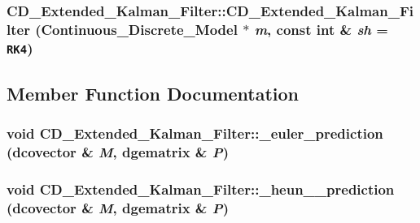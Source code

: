 \hypertarget{class_c_d___extended___kalman___filter_01743a0e2ac32830a65da4dc7885cc20}{
\subsubsection[{CD\_\-Extended\_\-Kalman\_\-Filter}]{\setlength{\rightskip}{0pt plus 5cm}CD\_\-Extended\_\-Kalman\_\-Filter::CD\_\-Extended\_\-Kalman\_\-Filter ({\bf Continuous\_\-Discrete\_\-Model} $\ast$ {\em m}, \/  const int \& {\em sh} = {\tt RK4})}}
\label{class_c_d___extended___kalman___filter_01743a0e2ac32830a65da4dc7885cc20}




\subsection{Member Function Documentation}
\hypertarget{class_c_d___extended___kalman___filter_64fda06630749c6d5936fd7257690c68}{
\subsubsection[{\_\-euler\_\-prediction}]{\setlength{\rightskip}{0pt plus 5cm}void CD\_\-Extended\_\-Kalman\_\-Filter::\_\-euler\_\-prediction (dcovector \& {\em M}, \/  dgematrix \& {\em P})}}
\label{class_c_d___extended___kalman___filter_64fda06630749c6d5936fd7257690c68}


\hypertarget{class_c_d___extended___kalman___filter_f67b43de36333a88e233bb6c51d15ab7}{
\subsubsection[{\_\-heun\_\-\_\-prediction}]{\setlength{\rightskip}{0pt plus 5cm}void CD\_\-Extended\_\-Kalman\_\-Filter::\_\-heun\_\-\_\-prediction (dcovector \& {\em M}, \/  dgematrix \& {\em P})}}
\label{class_c_d___extended___kalman___filter_f67b43de36333a88e233bb6c51d15ab7}


